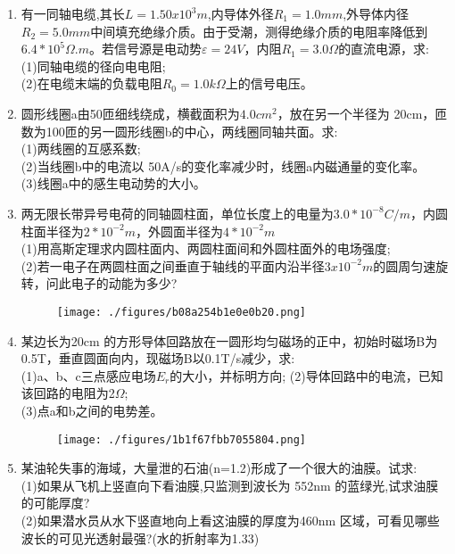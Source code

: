 
\begin{enumerate}
\item 有一同轴电缆,其长$L=1.50x10^3m$,内导体外径$R_1=1.0mm$,外导体内径$R_2=5.0mm$中间填充绝缘介质。由于受潮，测得绝缘介质的电阻率降低到$6.4*10^5\Omega .m$。若信号源是电动势$\varepsilon=24V$，内阻$R_1=3.0\Omega$的直流电源，求:\\
(1)同轴电缆的径向电电阻;\\
(2)在电缆末端的负载电阻$R_0=1.0k \Omega$上的信号电压。
\item 圆形线圈a由50匝细线绕成，横截面积为$4.0cm^2$，放在另一个半径为 20cm，匝数为100匝的另一圆形线圈b的中心，两线圈同轴共面。求:\\
(1)两线圈的互感系数;\\
(2)当线圈b中的电流以 50A/s的变化率减少时，线圈a内磁通量的变化率。\\
(3)线圈a中的感生电动势的大小。
\item 两无限长带异号电荷的同轴圆柱面，单位长度上的电量为$3.0*10^{-8}C/m$，内圆柱面半径为$2*10^{-2}m$，外圆面半径为$4*10^{-2}m$\\
(1)用高斯定理求内圆柱面内、两圆柱面间和外圆柱面外的电场强度;\\
(2)若一电子在两圆柱面之间垂直于轴线的平面内沿半径$3x10^{-2}m$的圆周匀速旋转，问此电子的动能为多少?
\begin{figure}[ht]
\centering
\texttt{[image: ./figures/b08a254b1e0e0b20.png]}
\caption{} \label{fig_SD08_1}
\end{figure}
\item 某边长为20cm 的方形导体回路放在一圆形均匀磁场的正中，初始时磁场B为 0.5T，垂直圆面向内，现磁场B以0.1T/s减少，求:\\
(1)a、b、c三点感应电场$E_r$的大小，并标明方向;
(2)导体回路中的电流，已知该回路的电阻为2$\Omega$;\\
(3)点a和b之间的电势差。
\begin{figure}[ht]
\centering
\texttt{[image: ./figures/1b1f67fbb7055804.png]}
\caption{} \label{fig_SD08_2}
\end{figure}
\item 某油轮失事的海域，大量泄的石油(n=1.2)形成了一个很大的油膜。试求:\\
(1)如果从飞机上竖直向下看油膜,只监测到波长为 552nm 的蓝绿光,试求油膜的可能厚度?\\
(2)如果潜水员从水下竖直地向上看这油膜的厚度为460nm 区域，可看见哪些波长的可见光透射最强?(水的折射率为1.33)

\end{enumerate}
